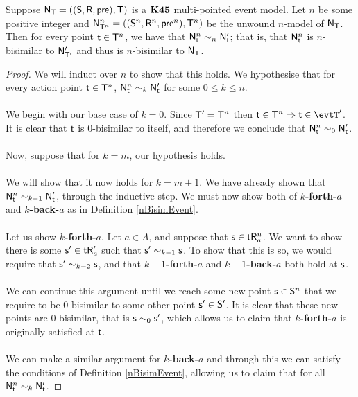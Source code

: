 \begin{lemma} \label{lemma:unwoundNModelNBisimilar}
  Suppose $\mathrm{\mathsf{N}}_\mathrm{\mathsf{T}} = ((\mathrm{\mathsf{S}},\mathrm{\mathsf{R}},\mathrm{\mathsf{pre}}),\mathrm{\mathsf{T}})$ is a $\bf K45$ multi-pointed
  event model.
  Let $n$ be some positive integer and $\mathrm{\mathsf{N}}^n_{\mathrm{\mathsf{T}}^n} = ((\mathrm{\mathsf{S}}^n,\mathrm{\mathsf{R}}^n,\mathrm{\mathsf{pre}}^n),\mathrm{\mathsf{T}}^n)$ be the
	unwound $n$-model of $\mathrm{\mathsf{N}}_\mathrm{\mathsf{T}}$.
	Then for every point $\mathrm{\mathsf{t}} \in \mathrm{\mathsf{T}}^n$, we have that $\mathrm{\mathsf{N}}^n_\mathrm{\mathsf{t}} \sim_n \mathrm{\mathsf{N}}'_{\mathrm{\mathsf{t}}}$; that is,
	that $\mathrm{\mathsf{N}}^n_{\mathrm{\mathsf{t}}}$ is $n$-bisimilar to $\mathrm{\mathsf{N}}'_{\mathrm{\mathsf{T}}'}$ and thus is
  $n$-bisimilar to $\mathrm{\mathsf{N}}_\mathrm{\mathsf{T}}$.
\end{lemma}
\begin{proof}
	We will induct over $n$ to show that this holds.
	We hypothesise that for every action point $\mathrm{\mathsf{t}} \in \mathrm{\mathsf{T}}^n$, $\mathrm{\mathsf{N}}^n_\mathrm{\mathsf{t}} \sim_k \mathrm{\mathsf{N}}'_{\mathrm{\mathsf{t}}}$
	for some $0 \leq k \leq n$.\\
	\\
	We begin with our base case of $k = 0$.
	Since $\mathrm{\mathsf{T}}' = \mathrm{\mathsf{T}}^n$ then $\evt \in \evT^n \Rightarrow \evt \in \evtT'$.
	It is clear that $\mathrm{\mathsf{t}}$ is $0$-bisimilar to itself, and therefore we conclude that $\mathrm{\mathsf{N}}^n_\mathrm{\mathsf{t}}
	\sim_0 \mathrm{\mathsf{N}}'_\mathrm{\mathsf{t}}$.\\
	\\
	Now, suppose that for $k = m$, our hypothesis holds.\\
	\\
	We will show that it now holds for $k = m+1$.
	We have already shown that $\mathrm{\mathsf{N}}^n_\mathrm{\mathsf{t}} \sim_{k-1} \mathrm{\mathsf{N}}'_\mathrm{\mathsf{t}}$, through the inductive step.
	We must now show both of {\bf $k$-forth-$a$} and {\bf $k$-back-$a$} as in Definition
	\ref{nBisimEvent}.\\
	\\
	Let us show {\bf $k$-forth-$a$}.
	Let $a \in A$, and suppose that $\mathrm{\mathsf{s}} \in \mathrm{\mathsf{t}} \mathrm{\mathsf{R}}^n_a$.
	We want to show there is some $\mathrm{\mathsf{s}}' \in \mathrm{\mathsf{t}} \mathrm{\mathsf{R}}'_a$ such that $\mathrm{\mathsf{s}}' \sim_{k-1} \mathrm{\mathsf{s}}$.
	To show that this is so, we would require that $\mathrm{\mathsf{s}}' \sim_{k-2} \mathrm{\mathsf{s}}$, and that {\bf
	$k-1$-forth-$a$} and {\bf $k-1$-back-$a$} both hold at $\mathrm{\mathsf{s}}$.\\
	\\
	We can continue this argument until we reach some new point $\mathrm{\mathsf{s}} \in \mathrm{\mathsf{S}}^n$ that we require to be
	$0$-bisimilar to some other point $\mathrm{\mathsf{s}}' \in \mathrm{\mathsf{S}}'$.
	It is clear that these new points are 0-bisimilar, that is $\mathrm{\mathsf{s}} \sim_0 \mathrm{\mathsf{s}}'$, which allows us to
	claim that {\bf $k$-forth-$a$} is originally satisfied at $\mathrm{\mathsf{t}}$.\\
	\\
	We can make a similar argument for {\bf $k$-back-$a$} and through this we can satisfy the
	conditions of Definition \ref{nBisimEvent}, allowing us to claim that for all $\mathrm{\mathsf{N}}^n_\mathrm{\mathsf{t}} \sim_k
	\mathrm{\mathsf{N}}'_{\mathrm{\mathsf{t}}}$.
\end{proof}

